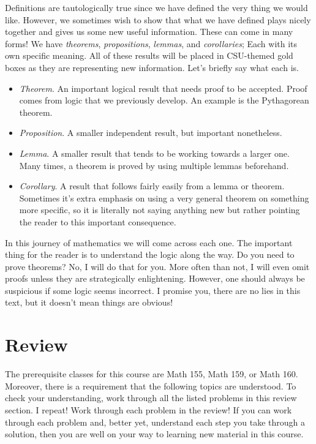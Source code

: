     Definitions are tautologically true since we have defined the very thing we would like.  However, we sometimes wish to show that what we have defined plays nicely together and gives us some new useful information.  These can come in many forms!  We have \emph{theorems}, \emph{propositions}, \emph{lemmas}, and \emph{corollaries}; Each with its own specific meaning.  All of these results will be placed in CSU-themed gold boxes as they are representing new information. Let's briefly say what each is.
    
    \begin{itemize}
        \item \emph{Theorem}. An important logical result that needs proof to be accepted.  Proof comes from logic that we previously develop.  An example is the Pythagorean theorem.
        \item \emph{Proposition}. A smaller independent result, but important nonetheless.
        \item \emph{Lemma}. A smaller result that tends to be working towards a larger one.  Many times, a theorem is proved by using multiple lemmas beforehand.  
        \item \emph{Corollary}. A result that follows fairly easily from a lemma or theorem.  Sometimes it's extra emphasis on using a very general theorem on something more specific, so it is literally not saying anything new but rather pointing the reader to this important consequence.
    \end{itemize}
    
    In this journey of mathematics we will come across each one.  The important thing for the reader is to understand the logic along the way.  Do you need to prove theorems? No, I will do that for you. More often than not, I will even omit proofs unless they are strategically enlightening.  However, one should always be suspicious if some logic seems incorrect. I promise you, there are no lies in this text, but it doesn't mean things are obvious!
    
    
    \section{Review}
    The prerequisite classes for this course are Math 155, Math 159, or Math 160.  Moreover, there is a requirement that the following topics are understood.  To check your understanding, work through all the listed problems in this review section. I repeat! Work through each problem in the review! If you can work through each problem and, better yet, understand each step you take through a solution, then you are well on your way to learning new material in this course.
    
